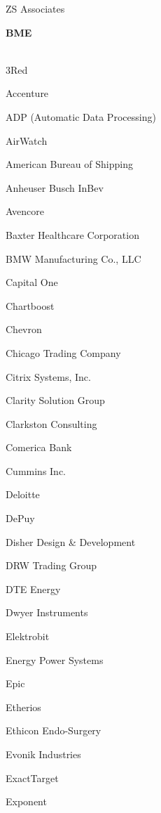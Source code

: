 \documentclass[twoside]{article}
\begin{document}
\begin{center}
\begin{multicols}{5}
\begin{FlushLeft}
\begin{compactitem}
\item ZS Associates
\end{compactitem}
        \end{FlushLeft}
        \vspace{1em}
        {\fontsize{14}{16}\selectfont \bf BME}\\
        \vspace{-1em}
        ~\hrulefill~
        \vspace{-.9em}
        \begin{FlushLeft}
        \begin{compactitem}
        \item 3Red
\item Accenture
\item ADP (Automatic Data Processing)
\item AirWatch
\item American Bureau of Shipping
\item Anheuser Busch InBev
\item Avencore
\item Baxter Healthcare Corporation
\item BMW Manufacturing Co., LLC
\item Capital One
\item Chartboost
\item Chevron
\item Chicago Trading Company
\item Citrix Systems, Inc.
\item Clarity Solution Group
\item Clarkston Consulting
\item Comerica Bank
\item Cummins Inc.
\item Deloitte
\item DePuy
\item Disher Design \& Development
\item DRW Trading Group
\item DTE Energy
\item Dwyer Instruments
\item Elektrobit
\item Energy Power Systems
\item Epic
\item Etherios
\item Ethicon Endo-Surgery
\item Evonik Industries
\item ExactTarget
\item Exponent

\end{compactitem}
\end{FlushLeft}
\end{multicols}
\end{center}
\end{document}
